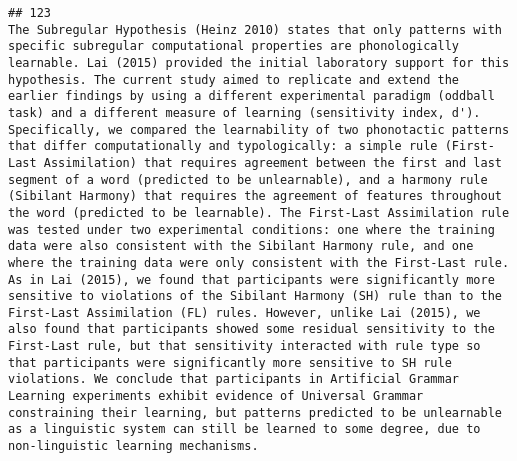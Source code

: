 \documentclass[
  english,
  man]{apa6}
\begin{document}
\begin{verbatim}
## 123                                                                                                                                                                                                                                                                                                                                                                                                                                                                                                                                                                                                                                                                                                                                                                                                                                                                        The Subregular Hypothesis (Heinz 2010) states that only patterns with specific subregular computational properties are phonologically learnable. Lai (2015) provided the initial laboratory support for this hypothesis. The current study aimed to replicate and extend the earlier findings by using a different experimental paradigm (oddball task) and a different measure of learning (sensitivity index, d'). Specifically, we compared the learnability of two phonotactic patterns that differ computationally and typologically: a simple rule (First-Last Assimilation) that requires agreement between the first and last segment of a word (predicted to be unlearnable), and a harmony rule (Sibilant Harmony) that requires the agreement of features throughout the word (predicted to be learnable). The First-Last Assimilation rule was tested under two experimental conditions: one where the training data were also consistent with the Sibilant Harmony rule, and one where the training data were only consistent with the First-Last rule. As in Lai (2015), we found that participants were significantly more sensitive to violations of the Sibilant Harmony (SH) rule than to the First-Last Assimilation (FL) rules. However, unlike Lai (2015), we also found that participants showed some residual sensitivity to the First-Last rule, but that sensitivity interacted with rule type so that participants were significantly more sensitive to SH rule violations. We conclude that participants in Artificial Grammar Learning experiments exhibit evidence of Universal Grammar constraining their learning, but patterns predicted to be unlearnable as a linguistic system can still be learned to some degree, due to non-linguistic learning mechanisms.

\end{verbatim}
\end{document}
